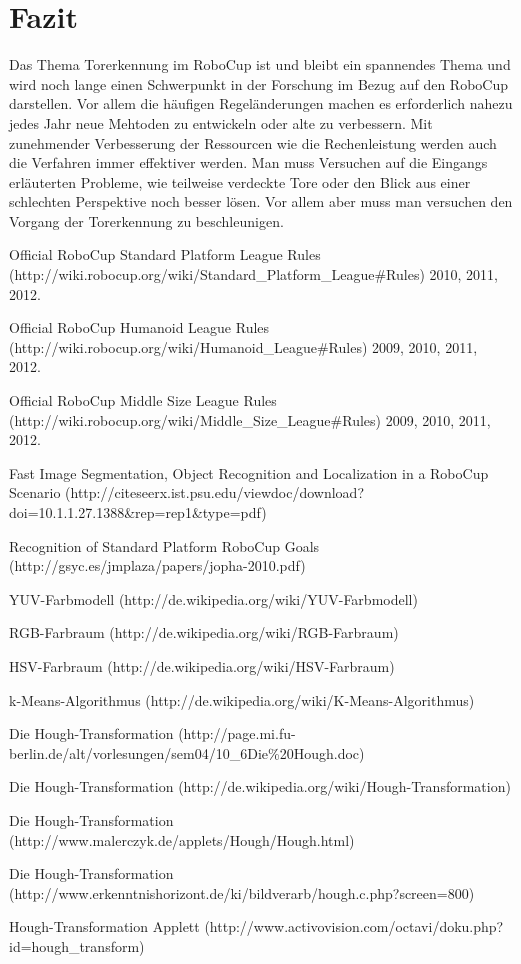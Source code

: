 \documentclass[a4paper,12pt]{article}
\begin{document}
\section{Fazit}
Das Thema Torerkennung im RoboCup ist und bleibt ein spannendes Thema und wird noch lange einen Schwerpunkt in der Forschung im Bezug auf den RoboCup darstellen. Vor allem die häufigen Regeländerungen machen es erforderlich nahezu jedes Jahr neue Mehtoden zu entwickeln oder alte zu verbessern. Mit zunehmender Verbesserung der Ressourcen wie die Rechenleistung werden auch die Verfahren immer effektiver werden. Man muss Versuchen auf die Eingangs erläuterten Probleme, wie teilweise verdeckte Tore oder den Blick aus einer schlechten Perspektive noch besser lösen. Vor allem aber muss man versuchen den Vorgang der Torerkennung zu beschleunigen.

\newpage

\begin{thebibliography}{9}

  Official RoboCup Standard Platform League Rules (http://wiki.robocup.org/wiki/Standard\_Platform\_League\#Rules)
  2010, 2011, 2012.

  Official RoboCup Humanoid League Rules (http://wiki.robocup.org/wiki/Humanoid\_League\#Rules)
  2009, 2010, 2011, 2012.  

  Official RoboCup Middle Size League Rules (http://wiki.robocup.org/wiki/Middle\_Size\_League\#Rules)
  2009, 2010, 2011, 2012.

  Fast Image Segmentation, Object Recognition and Localization in a RoboCup Scenario (http://citeseerx.ist.psu.edu/viewdoc/download?doi=10.1.1.27.1388\&rep=rep1\&type=pdf)

  Recognition of Standard Platform RoboCup Goals (http://gsyc.es/jmplaza/papers/jopha-2010.pdf)

  YUV-Farbmodell (http://de.wikipedia.org/wiki/YUV-Farbmodell)

  RGB-Farbraum (http://de.wikipedia.org/wiki/RGB-Farbraum)

  HSV-Farbraum (http://de.wikipedia.org/wiki/HSV-Farbraum)

  k-Means-Algorithmus (http://de.wikipedia.org/wiki/K-Means-Algorithmus)
  
  Die Hough-Transformation (http://page.mi.fu-berlin.de/alt/vorlesungen/sem04/10\_6Die\%20Hough.doc)
  
  Die Hough-Transformation (http://de.wikipedia.org/wiki/Hough-Transformation)

  Die Hough-Transformation (http://www.malerczyk.de/applets/Hough/Hough.html)
  
  Die Hough-Transformation (http://www.erkenntnishorizont.de/ki/bildverarb/hough.c.php?screen=800)
  
  Hough-Transformation Applett (http://www.activovision.com/octavi/doku.php?id=hough\_transform)
\end{thebibliography}
\end{document}
